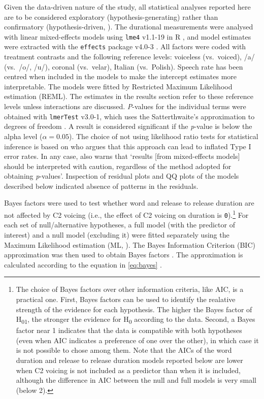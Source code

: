 \documentclass[charis]{glossa}
\begin{document}
Given the data-driven nature of the study, all statistical analyses
reported here are to be considered exploratory (hypothesis-generating)
rather than confirmatory (hypothesis-driven,
\citealt{kerr1998, gelman2013, roettger2018}). The durational
measurements were analysed with linear mixed-effects models using
\texttt{lme4} v1.1-19 in R \citep{bates2015}, and model estimates were
extracted with the \texttt{effects} package v4.0-3 \citep{fox2003}. All
factors were coded with treatment contrasts and the following reference
levels: voiceless (vs.~voiced), /a/ (vs.~/o/, /u/), coronal (vs.~velar),
Italian (vs.~Polish). Speech rate has been centred when included in the
models to make the intercept estimates more interpretable. The models
were fitted by Restricted Maximum Likelihood estimation (REML). The
estimates in the results section refer to these reference levels unless
interactions are discussed. \emph{P}-values for the individual terms
were obtained with \texttt{lmerTest} v3.0-1, which uses the
Satterthwaite's approximation to degrees of freedom
\citep{kuznetsova2017, luke2017}. A result is considered significant if
the \emph{p}-value is below the alpha level (\(\alpha = 0.05\)). The
choice of not using likelihood ratio tests for statistical inference is
based on \citet{luke2017} who argues that this approach can lead to
inflated Type I error rates. In any case, \citet[1501]{luke2017} also
warns that `results {[}from mixed-effects models{]} should be
interpreted with caution, regardless of the method adopted for obtaining
\textit{p}-values'. Inspection of residual plots and QQ plots of the
models described below indicated absence of patterns in the residuals.

Bayes factors were used to test whether word and release to release
duration are not affected by C2 voicing (i.e., the effect of C2 voicing
on duration is
\texttt{0}).\footnote{The choice of Bayes factors over other information criteria, like AIC, is a practical one. First, Bayes factors can be used to identify the realative strength of the evidence for each hypothesis. The higher the Bayes factor of H\textsubscript{01}, the stronger the evidence for H\textsubscript{0} according to the data. Second, a Bayes factor near 1 indicates that the data is compatible with both hypotheses (even when AIC indicates a preference of one over the other), in which case it is not possible to chose among them. Note that the AICs of the word duration and release to release duration models reported below are lower when C2 voicing is not included as a predictor than when it is included, although the difference in AIC between the null and full models is very small (below 2).}
For each set of null/alternative hypotheses, a full model (with the
predictor of interest) and a null model (excluding it) were fitted
separately using the Maximum Likelihood estimation (ML,
\citealt[34]{bates2015}). The Bayes Information Criterion (BIC)
approximation was then used to obtain Bayes factors
\citep{raftery1995, raftery1999, wagenmakers2007, jarosz2014}. The
approximation is calculated according to the equation in \ref{eq:bayes}
\citep[796]{wagenmakers2007}.
\end{document}
